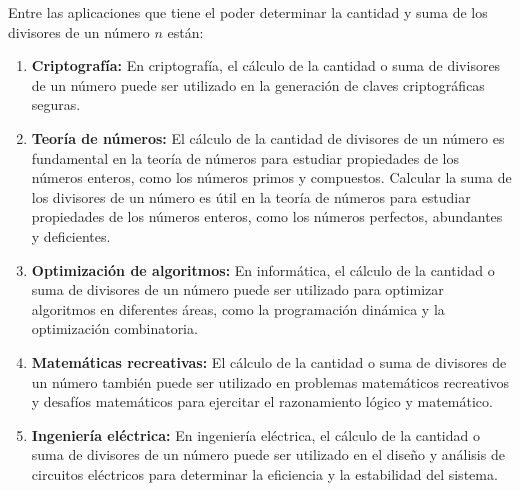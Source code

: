 Entre las aplicaciones que tiene el poder determinar la cantidad y suma de los divisores de un número $n$ están:

\begin{enumerate}
	\item \textbf{Criptografía:} En criptografía, el cálculo de la cantidad o suma de divisores  de un número puede ser utilizado en la generación de claves criptográficas seguras.
	
	\item \textbf{Teoría de números:} El cálculo de la cantidad de divisores de un número es fundamental en la teoría de números para estudiar propiedades de los números enteros, como los números primos y compuestos. Calcular la suma de los divisores de un número es útil en la teoría de números para estudiar propiedades de los números enteros, como los números perfectos, abundantes y deficientes.
	
	\item \textbf{Optimización de algoritmos:} En informática, el cálculo de la cantidad o suma de divisores de un número puede ser utilizado para optimizar algoritmos en diferentes áreas, como la programación dinámica y la optimización combinatoria.
	
	\item \textbf{Matemáticas recreativas:} El cálculo de la cantidad o suma de divisores de un número también puede ser utilizado en problemas matemáticos recreativos y desafíos matemáticos para ejercitar el razonamiento lógico y matemático. 
	
	\item  \textbf{Ingeniería eléctrica:} En ingeniería eléctrica, el cálculo de la cantidad o suma de divisores de un número puede ser utilizado en el diseño y análisis de circuitos eléctricos para determinar la eficiencia y la estabilidad del sistema.
	
\end{enumerate}
